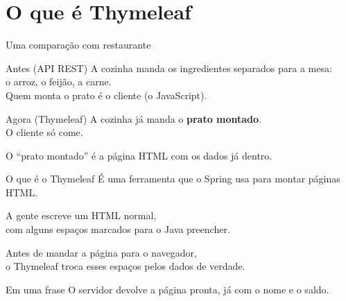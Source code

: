 \documentclass[aspectratio=169,11pt]{beamer}
\begin{document}
\section{O que é Thymeleaf}

\begin{frame}{Uma comparação com restaurante}
  \begin{block}{Antes (API REST)}
    A cozinha manda os ingredientes separados para a mesa:\\
    o arroz, o feijão, a carne.\\
    Quem monta o prato é o cliente (o JavaScript).
  \end{block}

  \vspace{0.5em}
  \begin{block}{Agora (Thymeleaf)}
    A cozinha já manda o \textbf{prato montado}.\\
    O cliente só come.
  \end{block}

  \vspace{0.5em}
  O ``prato montado'' é a página HTML com os dados já dentro.
\end{frame}

\begin{frame}{O que é o Thymeleaf}
  É uma ferramenta que o Spring usa para montar páginas HTML.

  \vspace{0.6em}
  A gente escreve um HTML normal,\\
  com alguns espaços marcados para o Java preencher.

  \vspace{0.6em}
  Antes de mandar a página para o navegador,\\
  o Thymeleaf troca esses espaços pelos dados de verdade.

  \vspace{0.6em}
  \begin{block}{Em uma frase}
    O servidor devolve a página pronta, já com o nome e o saldo.
  \end{block}
\end{frame}
\end{document}
